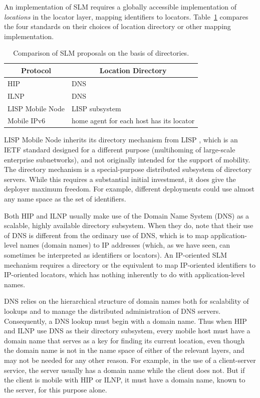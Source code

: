 An implementation of SLM requires a globally accessible
implementation of {\it locations} in the locator layer, mapping 
identifiers to locators.
Table~\ref{tab:slm2} compares the four standards on their choices of
location directory or other mapping implementation.

\begin{table}
\begin{center}
\footnotesize
\begin{tabular}{|l|l|} \hline
\multicolumn{1}{|c|}{\bf Protocol} & 
  \multicolumn{1}{c|}{\bf Location Directory} \\ \hline 
HIP & DNS \\ \hline
ILNP & DNS \\ \hline
LISP Mobile Node & LISP subsystem \\ \hline
Mobile IPv6 & home agent for each host has its locator  \\ \hline
\end{tabular}
\end{center}
\caption{Comparison of SLM proposals on the basis of directories.}
\label{tab:slm2}
\end{table}

LISP Mobile Node inherits its directory mechanism from LISP \cite{LISP},
which is an IETF standard designed for a different purpose 
(multihoming of large-scale enterprise subnetworks), and not
originally intended for the support of mobility.
The directory mechanism is a special-purpose distributed subsystem
of directory servers.
While this requires a substantial initial investment, it does give
the deployer maximum freedom.
For example, different deployments could use almost any name space
as the set of identifiers.
 
Both HIP and ILNP usually make use of the Domain Name System (DNS) as a
scalable, highly available directory subsystem.
When they do, note that their use of DNS is different from the
ordinary use of DNS, which is to map application-level names
(domain names) to IP addresses (which, as we have seen, can sometimes
be interpreted as identifiers or locators).
An IP-oriented SLM mechanism requires a directory or the equivalent to map
IP-oriented
identifiers to IP-oriented
locators, which has nothing inherently
to do with application-level names.

DNS relies on the hierarchical structure of domain names both
for scalability of lookups and to manage the distributed
administration of DNS servers.
Consequently, a DNS lookup must begin with a domain name.
Thus when HIP and ILNP use DNS as their directory subsystem,
every mobile host must have a domain name that serves as a key for 
finding its current location, even though the domain name is not
in the name space of either of the relevant layers, and may not be
needed for any other reason.
For example, in the use of a client-server service, 
the server usually has a domain name while the client does not.
But if the client is mobile with HIP or ILNP, it must have a domain
name, known to the server, for this purpose alone.

